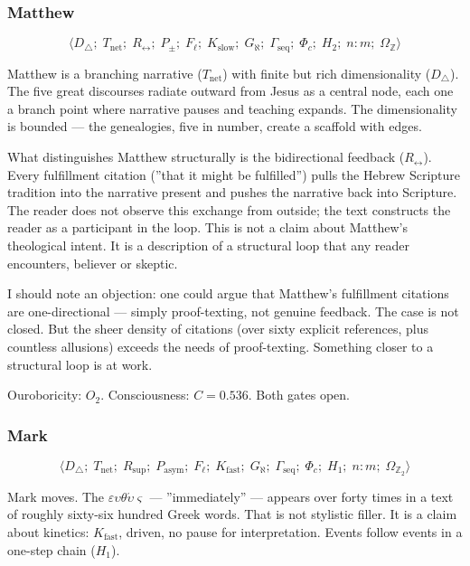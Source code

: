 \documentclass[12pt,a4paper]{article}
\begin{document}
\subsubsection{Matthew}

\[\langle D_{\triangle};\; T_\text{net};\; R_{\leftrightarrow};\; P_{\pm};\; F_{\ell};\; K_\text{slow};\; G_{\aleph};\; \Gamma_\text{seq};\; \Phi_c;\; H_2;\; n{:}m;\; \Omega_\mathbb{Z} \rangle\]

Matthew is a branching narrative ($T_\text{net}$) with finite but rich dimensionality ($D_{\triangle}$). The five great discourses radiate outward from Jesus as a central node, each one a branch point where narrative pauses and teaching expands. The dimensionality is bounded --- the genealogies, five in number, create a scaffold with edges.

What distinguishes Matthew structurally is the bidirectional feedback ($R_{\leftrightarrow}$). Every fulfillment citation (''that it might be fulfilled'') pulls the Hebrew Scripture tradition into the narrative present and pushes the narrative back into Scripture. The reader does not observe this exchange from outside; the text constructs the reader as a participant in the loop. This is not a claim about Matthew's theological intent. It is a description of a structural loop that any reader encounters, believer or skeptic.

I should note an objection: one could argue that Matthew's fulfillment citations are one-directional --- simply proof-texting, not genuine feedback. The case is not closed. But the sheer density of citations (over sixty explicit references, plus countless allusions) exceeds the needs of proof-texting. Something closer to a structural loop is at work.

Ouroboricity: $O_2$. Consciousness: $C = 0.536$. Both gates open.

\subsubsection{Mark}

\[\langle D_{\triangle};\; T_\text{net};\; R_\text{sup};\; P_\text{asym};\; F_{\ell};\; K_\text{fast};\; G_{\aleph};\; \Gamma_\text{seq};\; \Phi_c;\; H_1;\; n{:}m;\; \Omega_{\mathbb{Z}_2} \rangle\]

Mark moves. The $\varepsilon\upsilon\theta\acute{\upsilon}\varsigma$ --- ''immediately'' --- appears over forty times in a text of roughly sixty-six hundred Greek words. That is not stylistic filler. It is a claim about kinetics: $K_\text{fast}$, driven, no pause for interpretation. Events follow events in a one-step chain ($H_1$).
\end{document}

